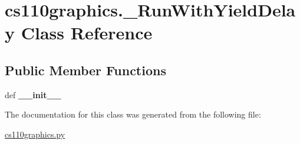 \hypertarget{classcs110graphics_1_1__RunWithYieldDelay}{
\section{cs110graphics.\_\-RunWithYieldDelay Class Reference}
\label{classcs110graphics_1_1__RunWithYieldDelay}
}
\subsection*{Public Member Functions}
\begin{DoxyCompactItemize}
\item 
\hypertarget{classcs110graphics_1_1__RunWithYieldDelay_a996b2bc2d41832713f121a90453c9c37}{
def {\bfseries \_\-\_\-init\_\-\_\-}}
\label{classcs110graphics_1_1__RunWithYieldDelay_a996b2bc2d41832713f121a90453c9c37}

\end{DoxyCompactItemize}


The documentation for this class was generated from the following file:\begin{DoxyCompactItemize}
\item 
\hyperlink{cs110graphics_8py}{cs110graphics.py}\end{DoxyCompactItemize}
